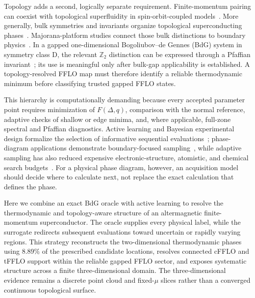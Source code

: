 Topology adds a second, logically separate requirement. Finite-momentum pairing can coexist with topological superfluidity in spin-orbit-coupled models~\cite{ZhangYi2013,QuEtAl2013,CaoEtAl2014}. More generally, bulk symmetries and invariants organize topological superconducting phases~\cite{ReadGreen2000,SatoAndo2017,QiZhang2011,SchnyderEtAl2008,RyuEtAl2010}. Majorana-platform studies connect those bulk distinctions to boundary physics~\cite{LutchynSauDasSarma2010,OregRefaelVonOppen2010,Alicea2012,Beenakker2013}. In a gapped one-dimensional Bogoliubov--de Gennes (BdG) system in symmetry class D, the relevant $\mathbb Z_2$ distinction can be expressed through a Pfaffian invariant~\cite{Kitaev2001,BudichArdonne2013}; its use is meaningful only after bulk-gap applicability is established. A topology-resolved FFLO map must therefore identify a reliable thermodynamic minimum before classifying trusted gapped FFLO states.

This hierarchy is computationally demanding because every accepted parameter point requires minimization of $F(\Delta,q)$, comparison with the normal reference, adaptive checks of shallow or edge minima, and, where applicable, full-zone spectral and Pfaffian diagnostics. Active learning and Bayesian experimental design formalize the selection of informative sequential evaluations~\cite{CohnAtlasLadner1994,MacKay1992,ShahriariEtAl2016}; phase-diagram applications demonstrate boundary-focused sampling~\cite{TerayamaEtAl2019,DaiBrussGlotzer2020,LookmanEtAl2019}, while adaptive sampling has also reduced expensive electronic-structure, atomistic, and chemical search budgets~\cite{TranUlissi2018,PodryabinkinShapeev2017,JinnouchiEtAl2019,VandermauseEtAl2020,BatraEtAl2021,NoeEtAl2019}. For a physical phase diagram, however, an acquisition model should decide where to calculate next, not replace the exact calculation that defines the phase.

Here we combine an exact BdG oracle with active learning to resolve the thermodynamic and topology-aware structure of an altermagnetic finite-momentum superconductor.  The oracle supplies every physical label, while the surrogate redirects subsequent evaluations toward uncertain or rapidly varying regions.  This strategy reconstructs the two-dimensional thermodynamic phases using 8.89\% of the prescribed candidate locations, resolves connected cFFLO and tFFLO support within the reliable gapped FFLO sector, and exposes systematic structure across a finite three-dimensional domain.  The three-dimensional evidence remains a discrete point cloud and fixed-$\mu$ slices rather than a converged continuous topological surface.
